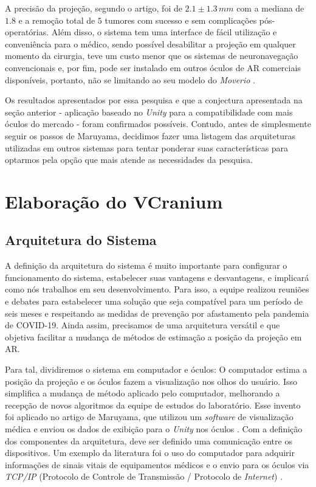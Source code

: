 A precisão da projeção, segundo o artigo, foi de \(2.1 \pm  1.3\,mm\) com a mediana de \(1.8\) e a remoção total de \(5\) tumores com sucesso e sem complicações pós-operatórias. Além disso, o sistema tem uma interface de fácil utilização e conveniência para o médico, sendo possível desabilitar a projeção em qualquer momento da cirurgia, teve um custo menor que os sistemas de neuronavegação convencionais e, por fim, pode ser instalado em outros óculos de AR comerciais disponíveis, portanto, não se limitando ao seu modelo do \textit{Moverio} \cite{Maruyama2018}.

Os resultados apresentados por essa pesquisa e que a conjectura apresentada na seção anterior - aplicação baseado no \textit{Unity} para a compatibilidade com mais óculos do mercado - foram confirmados possíveis. Contudo, antes de simplesmente seguir os passos de Maruyama, decidimos fazer uma listagem das arquiteturas utilizadas em outros sistemas para tentar ponderar suas características para optarmos pela opção que mais atende as necessidades da pesquisa.

\section{Elaboração do VCranium}

\subsection{Arquitetura do Sistema}

A definição da arquitetura do sistema é muito importante para configurar o funcionamento do sistema, estabelecer suas vantagens e desvantagens, e implicará como nós trabalhos em seu desenvolvimento. Para isso, a equipe realizou reuniões e debates para estabelecer uma solução que seja compatível para um período de seis meses e respeitando as medidas de prevenção por afastamento pela pandemia de COVID-19. Ainda assim, precisamos de uma arquitetura versátil e que objetiva facilitar a mudança de métodos de estimação a posição da projeção em AR. 

Para tal, dividiremos o sistema em computador e óculos: O computador estima a posição da projeção e os óculos fazem a visualização nos olhos do usuário. Isso simplifica a mudança de método aplicado pelo computador, melhorando a recepção de novos algoritmos da equipe de estudos do laboratório. Esse invento foi aplicado no artigo de Maruyama, que utilizou um \textit{software} de visualização médica e enviou os dados de exibição para o \textit{Unity} nos óculos \cite{Maruyama2018}. Com a definição dos componentes da arquitetura, deve ser definido uma comunicação entre os dispositivos. Um exemplo da literatura foi o uso do computador para adquirir informações de sinais vitais de equipamentos médicos e o envio para os óculos via \textit{TCP/IP} (Protocolo de Controle de Transmissão / Protocolo de \textit{Internet}) \cite{Arpaia2021}.

